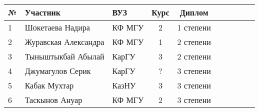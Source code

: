 \begin{center}
\begin{tabular}{|l|l|l|c|c|c|c|c|c|c|}
\hline
№ & Участник & ВУЗ & Курс & Диплом \\
\hline
1 & Шокетаева Надира & КФ МГУ & 2 & 1 степени \\
\hline
2 & Журавская Александра &  КФ МГУ & 1 & 2 степени \\
\hline
3 & Тыныштыкбай Абылай & КарГУ & 3 & 2 степени \\
\hline
4 & Джумагулов Серик & КарГУ & ? & 3 степени \\
\hline
5 & Кабак Мухтар & КазНУ & 3 & 3 степени \\
\hline
6 & Таскынов Ануар & КФ МГУ & 2 & 3 степени \\
\hline
\end{tabular}
\end{center}

